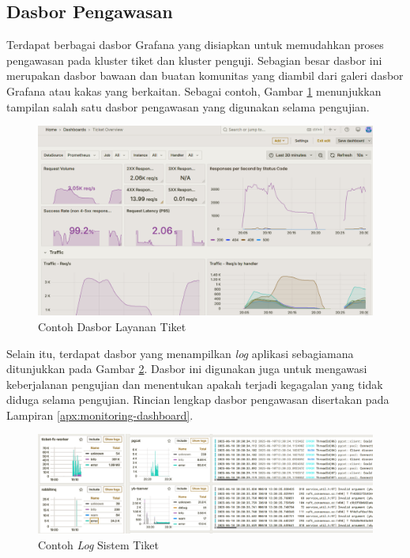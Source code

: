 \subsection{Dasbor Pengawasan}

Terdapat berbagai dasbor Grafana yang disiapkan untuk memudahkan proses pengawasan pada kluster tiket dan kluster penguji. Sebagian besar dasbor ini merupakan dasbor bawaan dan buatan komunitas yang diambil dari galeri dasbor Grafana atau kakas yang berkaitan. Sebagai contoh, Gambar \ref{fig:ticket-dashboard-example} menunjukkan tampilan salah satu dasbor pengawasan yang digunakan selama pengujian.

\begin{figure}[H]
    \centering
    \includegraphics[width=1\textwidth]{resources/chapter-4/ticket-dashboard.png}
    \caption{Contoh Dasbor Layanan Tiket}
    \label{fig:ticket-dashboard-example}
\end{figure}

Selain itu, terdapat dasbor yang menampilkan \textit{log} aplikasi sebagiamana ditunjukkan pada Gambar \ref{fig:log-example}. Dasbor ini digunakan juga untuk mengawasi keberjalanan pengujian dan menentukan apakah terjadi kegagalan yang tidak diduga selama pengujian. Rincian lengkap dasbor pengawasan disertakan pada Lampiran \ref{apx:monitoring-dashboard}.

\begin{figure}[H]
    \centering
    \includegraphics[width=1\textwidth]{resources/chapter-4/log.png}
    \caption{Contoh \textit{Log} Sistem Tiket}
    \label{fig:log-example}
\end{figure}
